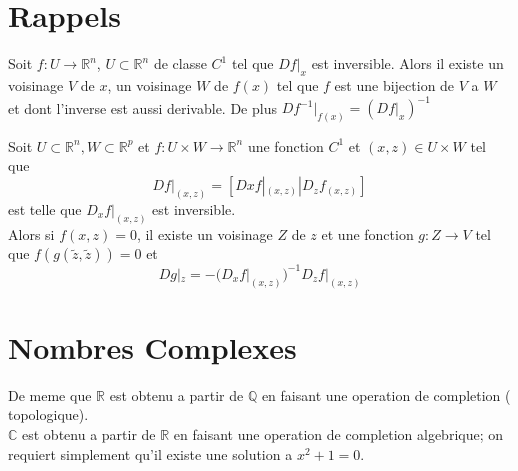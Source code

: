 \documentclass[../main.tex]{subfiles}
\begin{document}
\section{Rappels}
\begin{thm}
	Soit $f:U \to \mathbb{R}^n$, $U \subset \mathbb{R}^n$ de classe $C^1$ tel que $Df|_x$ est inversible.
	Alors il existe un voisinage $V $ de $x$, un voisinage $W$ de $f( x) $ tel que $f$ est une bijection de $V$ a $W$ et dont l'inverse est aussi derivable.
	De plus $Df^{-1}|_{f( x) } = ( Df|_x)^{-1} $ 
\end{thm}
\begin{thm}
	Soit $U \subset \mathbb{R}^n, W \subset \mathbb{R}^p$ et $f:U \times W\to \mathbb{R}^n$ une fonction $C^1$ et $( x,z) \in U\times W$ tel que
	\[ 
		Df|_{( x,z) } = \left[ Dxf|_{( x,z) } | D_z f_{( x,z) }  \right] 
	\]
	est telle que $D_xf|_{( x,z) } $ est inversible.\\
	Alors si $f( x,z) =0$, il existe un voisinage $Z$ de $z$ et une fonction $g:Z \to V$ tel que $f( g( \tilde z, \tilde z) ) =0$ et
	\[ 
		Dg|_{z} = - ( D_xf|_{( x,z) } ) ^{-1}D_{z} f|_{( x,z) } 
	\]
	

	
\end{thm}
\section{Nombres Complexes}
De meme que $\mathbb{R}$ est obtenu a partir de $\mathbb{Q}$ en faisant une operation de completion ( topologique).\\
$\mathbb{C}$ est obtenu a partir de $\mathbb{R}$ en faisant une operation de completion algebrique; on requiert simplement qu'il existe une solution a $x^{2}+1=0.$ 
\end{document}
